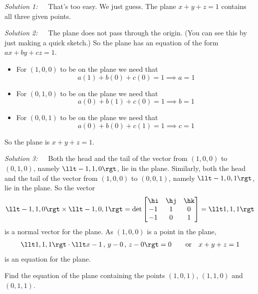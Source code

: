 \begin{solution}
\emph{Solution 1:}\ \ \ That's too easy. We just guess.
The plane $x+y+z=1$ contains all three given points.

\emph{Solution 2:}\ \ \ The plane does not pass through the origin.
(You can see this by just making a quick sketch.) So the plane has an equation
of the form $ax+by+cz=1$. 
\begin{itemize}
\item For $(1,0,0)$ to be on the plane we need that
\begin{equation*}
a(1) +b(0) +c(0) =1
\implies a=1
\end{equation*}
\item For $(0,1,0)$ to be on the plane we need that
\begin{equation*}
a(0) +b(1) +c(0) =1
\implies b=1
\end{equation*}
\item For $(0,0,1)$ to be on the plane we need that
\begin{equation*}
a(0) +b(0) +c(1) =1
\implies c=1
\end{equation*}
\end{itemize}
So the plane is $x+y+z=1$.

\emph{Solution 3:}\ \ \ 
Both the head and the tail of the vector from $(1,0,0)$ to $(0,1,0)$,
namely $\llt -1,1,0\rgt$, lie in the plane. Similarly, 
both the head and the tail of the vector from $(1,0,0)$ to $(0,0,1)$,
namely $\llt -1,0,1\rgt$, lie in the plane. So the vector
\begin{align*}
\llt -1,1,0\rgt \times \llt -1,0,1\rgt
=\det\left[\begin{matrix}
           \hi & \hj & \hk \\
           -1  &  1  &  0 \\
           -1  &  0  &  1
  \end{matrix}\right]
=\llt 1 , 1 ,1  \rgt
\end{align*}
is a normal vector for the plane. As $(1,0,0)$ is a point in the plane,
\begin{align*}
\llt 1 , 1 ,1 \rgt \cdot \llt x-1\,,\,y-0\,,\, z-0 \rgt = 0\qquad
\text{or}\quad
x+y+z=1
\end{align*}
is an equation for the plane.

\end{solution}


\begin{question}
Find the equation of the plane containing the points $(1,0,1)$,
$(1,1,0)$ and $(0,1,1)$.
\end{question}

